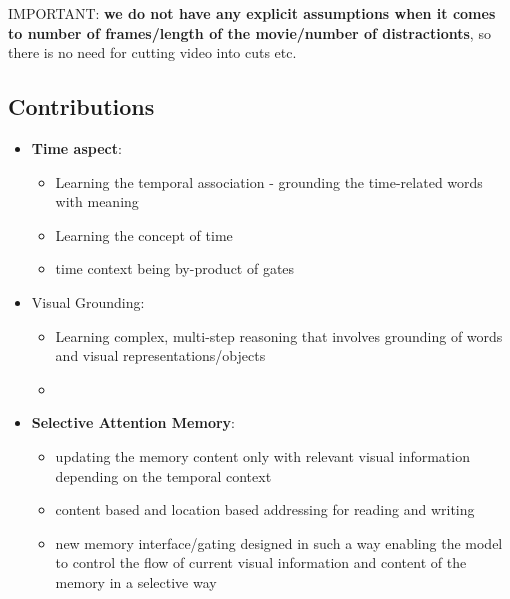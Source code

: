 IMPORTANT: \textbf{we do not have any explicit assumptions when it comes to number of frames/length of the movie/number of distractionts}, so there is no need for cutting video into cuts etc.

\subsection{Contributions}

\begin{itemize}
\item \textbf{Time aspect}:
\begin{itemize}
\item Learning the temporal association - grounding the time-related words with meaning
\item Learning the concept of time
\item time context being by-product of gates
\end{itemize}

\item Visual Grounding:
\begin{itemize}
\item Learning complex, multi-step reasoning that involves grounding of words and visual representations/objects
\item 
\end{itemize}
\item \textbf{Selective Attention Memory}:
\begin{itemize}
\item updating the memory content only with relevant visual information depending on the temporal context
\item content based and location based addressing for reading and writing
\item new memory interface/gating designed in such a way enabling the model to control the flow of current visual information and content of the memory in a selective way

\end{itemize}
\end{itemize}







